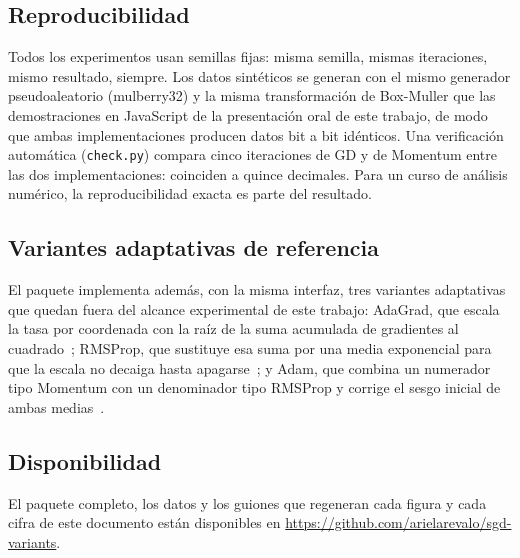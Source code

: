 \subsection{Reproducibilidad}

Todos los experimentos usan semillas fijas: misma semilla, mismas iteraciones, mismo resultado, siempre. Los datos sintéticos se generan con el mismo generador pseudoaleatorio (mulberry32) y la misma transformación de Box-Muller que las demostraciones en JavaScript de la presentación oral de este trabajo, de modo que ambas implementaciones producen datos bit a bit idénticos. Una verificación automática (\texttt{check.py}) compara cinco iteraciones de GD y de Momentum entre las dos implementaciones: coinciden a quince decimales. Para un curso de análisis numérico, la reproducibilidad exacta es parte del resultado.

\subsection{Variantes adaptativas de referencia}

El paquete implementa además, con la misma interfaz, tres variantes adaptativas que quedan fuera del alcance experimental de este trabajo: AdaGrad, que escala la tasa por coordenada con la raíz de la suma acumulada de gradientes al cuadrado~\cite{duchi2011}; RMSProp, que sustituye esa suma por una media exponencial para que la escala no decaiga hasta apagarse~\cite{tieleman2012}; y Adam, que combina un numerador tipo Momentum con un denominador tipo RMSProp y corrige el sesgo inicial de ambas medias~\cite{kingma2015}.

\subsection{Disponibilidad}

El paquete completo, los datos y los guiones que regeneran cada figura y cada cifra de este documento están disponibles en \url{https://github.com/arielarevalo/sgd-variants}.
